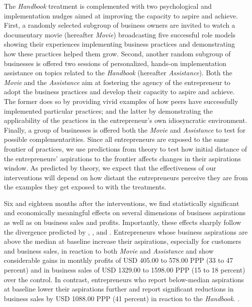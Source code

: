 \documentclass[11.5pt]{article}
\begin{document}

The \emph{Handbook} treatment is complemented with two psychological and implementation nudges aimed at improving the capacity to aspire and achieve. First, a randomly selected subgroup of business owners are invited to watch a documentary movie (hereafter \emph{Movie}) broadcasting five successful role models showing their experiences implementing business practices and demonstrating how these practices helped them grow. 
Second, another random subgroup of businesses is offered two sessions of personalized, hands-on implementation assistance on topics related to the \emph{Handbook} (hereafter \emph{Assistance}). 
Both the \emph{Movie} and the \emph{Assistance} aim at fostering the agency of the entrepreneur to adopt the business practices and develop their capacity to aspire and achieve. The former does so by providing vivid examples of how peers have successfully implemented particular practices; and the latter by demonstrating the applicability of the practices in the entrepreneur's own idiosyncratic environment. Finally, a group of businesses is offered both the \emph{Movie} and \emph{Assistance} to test for possible complementarities. Since all entrepreneurs are exposed to the same frontier of practices, we use predictions from theory to test how initial distance of the entrepreneurs' aspirations to the frontier affects changes in their aspirations window. As predicted by theory, we expect that the effectiveness of our interventions will depend on how distant the entrepreneurs perceive they are from the examples they get exposed to with the treatments.

Six and eighteen months after the interventions, we find statistically significant and economically meaningful effects on several dimensions of business aspirations as well as on business sales and profits. Importantly, these effects sharply follow the divergence predicted by \citet{Ray2006}, \citet{Genicot2017}, and \citet{Dalton2016}. Entrepreneurs whose business aspirations are above the median at baseline increase their aspirations, especially for customers and business sales, in reaction to both \emph{Movie} and \emph{Assistance} and show considerable gains in monthly profits of USD 405.00 to 578.00 PPP (33 to 47 percent) and in business sales of USD 1329.00 to 1598.00 PPP (15 to 18 percent) over the control. In contrast, entrepreneurs who report below-median aspirations at baseline lower their aspirations further and report significant reductions in business sales by USD 1088.00 PPP (41 percent) in reaction to the \emph{Handbook}. .
\end{document}
